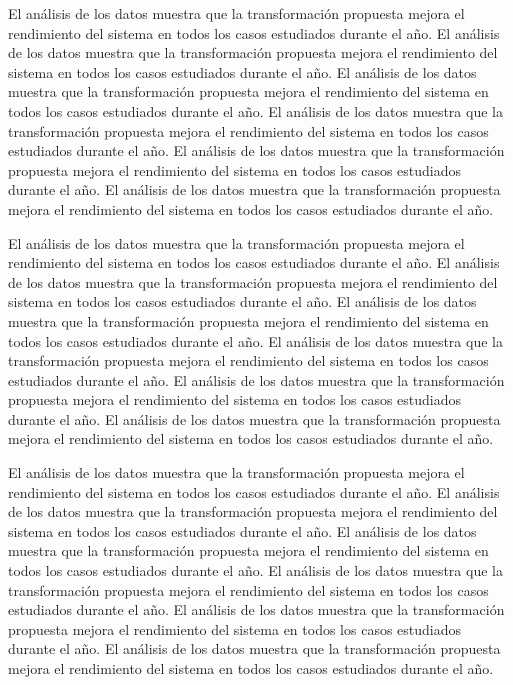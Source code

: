 \documentclass{article}
\begin{document}
El análisis de los datos muestra que la transformación propuesta mejora el rendimiento del sistema en todos los casos estudiados durante el año. El análisis de los datos muestra que la transformación propuesta mejora el rendimiento del sistema en todos los casos estudiados durante el año. El análisis de los datos muestra que la transformación propuesta mejora el rendimiento del sistema en todos los casos estudiados durante el año. El análisis de los datos muestra que la transformación propuesta mejora el rendimiento del sistema en todos los casos estudiados durante el año. El análisis de los datos muestra que la transformación propuesta mejora el rendimiento del sistema en todos los casos estudiados durante el año. El análisis de los datos muestra que la transformación propuesta mejora el rendimiento del sistema en todos los casos estudiados durante el año. 

El análisis de los datos muestra que la transformación propuesta mejora el rendimiento del sistema en todos los casos estudiados durante el año. El análisis de los datos muestra que la transformación propuesta mejora el rendimiento del sistema en todos los casos estudiados durante el año. El análisis de los datos muestra que la transformación propuesta mejora el rendimiento del sistema en todos los casos estudiados durante el año. El análisis de los datos muestra que la transformación propuesta mejora el rendimiento del sistema en todos los casos estudiados durante el año. El análisis de los datos muestra que la transformación propuesta mejora el rendimiento del sistema en todos los casos estudiados durante el año. El análisis de los datos muestra que la transformación propuesta mejora el rendimiento del sistema en todos los casos estudiados durante el año. 

El análisis de los datos muestra que la transformación propuesta mejora el rendimiento del sistema en todos los casos estudiados durante el año. El análisis de los datos muestra que la transformación propuesta mejora el rendimiento del sistema en todos los casos estudiados durante el año. El análisis de los datos muestra que la transformación propuesta mejora el rendimiento del sistema en todos los casos estudiados durante el año. El análisis de los datos muestra que la transformación propuesta mejora el rendimiento del sistema en todos los casos estudiados durante el año. El análisis de los datos muestra que la transformación propuesta mejora el rendimiento del sistema en todos los casos estudiados durante el año. El análisis de los datos muestra que la transformación propuesta mejora el rendimiento del sistema en todos los casos estudiados durante el año. 
\end{document}
